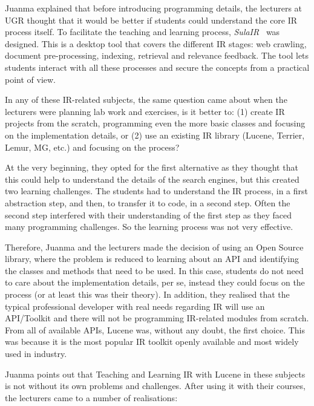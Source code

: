 Juanma explained that before introducing programming details, the lecturers at UGR thought that it would be better if  students could understand the core IR process itself. To facilitate the teaching and learning process, {\it SulaIR}~\cite{Fernandez2012} was designed. This is a desktop tool that covers the different IR stages: web crawling, document pre-processing,  indexing, retrieval and relevance feedback. The tool lets students interact with all these processes and secure the concepts from a practical point of view. 

In any of these IR-related subjects, the same question came about when the lecturers were planning 
lab work and exercises, is it better to: (1) create IR projects from the scratch, programming even the more basic classes and focusing on the implementation details, or (2) use an existing IR library (Lucene, Terrier, Lemur, MG, etc.) and focusing on the process?

At the very beginning, they opted for the first alternative as they thought that this could help to understand the details of the search engines, but this created two learning challenges. The students had to understand the IR process, in a first abstraction step,  and then, to transfer it to code, in a second step. Often the second step interfered with their understanding of the first step as they faced many programming challenges. So the learning process was not very effective.

Therefore, Juanma and the lecturers made the decision of using an Open Source library, where the problem is reduced to learning about an API and identifying the classes and methods that need to be used. In this case, students do not need to care about the implementation details, per se, instead they could focus on the process (or at least this was their theory). In addition, they realised that the typical professional developer with real needs regarding IR will use an API/Toolkit and there will not be programming IR-related modules from scratch. From all of available APIs, Lucene was, without any doubt, the first choice. This was because it is the most popular IR toolkit openly available and most widely used in industry.

Juanma points out that Teaching and Learning IR with Lucene in these subjects is not without its own problems and challenges. After using it with their courses, the lecturers came to a number of realisations:

